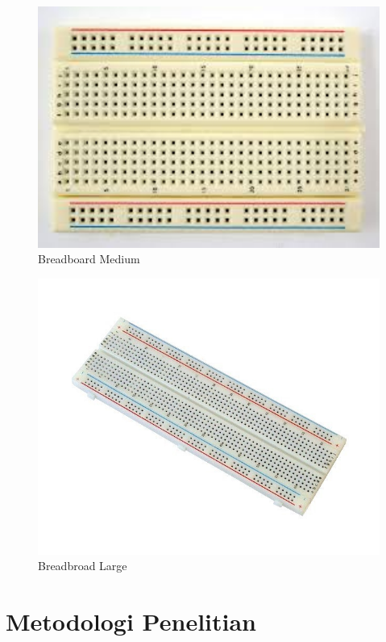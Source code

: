 \begin{enumerate}
\begin{figure}[H]
\centering
\includegraphics[width=1\textwidth]{figures/breadboard2.jpg}
\caption{Breadboard Medium}
\label{print}
\end{figure}

\begin{figure}[H]
\centering
\includegraphics[width=1\textwidth]{figures/3.jpg}
\caption{Breadbroad Large}
\label{print}
\end{figure}


\end{enumerate}

\section{Metodologi Penelitian}
